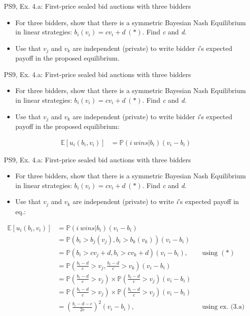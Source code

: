 \begin{frame}{PS9, Ex. 4.a: First-price sealed bid auctions with three bidders}
    \begin{itemize}
      \item[(a)] For three bidders, show that there is a symmetric Bayesian Nash Equilibrium in linear strategies: $b_i(v_i) = cv_i + d\ (*)$. Find \textit{c} and \textit{d}.
      \item[Hint:] Use that $v_j$ and $v_k$ are independent (private) to write bidder \textit{i}'s expected payoff in the proposed equilibrium.
    \end{itemize}
    \vfill\null
\end{frame}
\begin{frame}{PS9, Ex. 4.a: First-price sealed bid auctions with three bidders}
    \begin{itemize}
      \item[(a)] For three bidders, show that there is a symmetric Bayesian Nash Equilibrium in linear strategies: $b_i(v_i) = cv_i + d\ (*)$. Find \textit{c} and \textit{d}.
      \item[Hint:] Use that $v_j$ and $v_k$ are independent (private) to write bidder \textit{i}'s expected payoff in the proposed equilibrium:
    \end{itemize}
    \vspace{-10pt}
    \begin{align*}
      \mathbb{E}[u_i(b_i,v_i)]
      &=\mathbb{P}(i\ wins|b_i)(v_i-b_i)
    \end{align*}
    \vfill\null
\end{frame}
\begin{frame}{PS9, Ex. 4.a: First-price sealed bid auctions with three bidders}
    \begin{itemize}
      \item[(a)] For three bidders, show that there is a symmetric Bayesian Nash Equilibrium in linear strategies: $b_i(v_i) = cv_i + d\ (*)$. Find \textit{c} and \textit{d}.
      \item[Hint:] Use that $v_j$ and $v_k$ are independent (private) to write \textit{i}'s expected payoff in eq.:
    \end{itemize}
    \vspace{-10pt}
    \begin{align*}
      \mathbb{E}[u_i(b_i,v_i)]
      &=\mathbb{P}(i\ wins|b_i)(v_i-b_i)\\
      &=\mathbb{P}\left(b_i>b_j(v_j),b_i>b_k(v_k)\right)(v_i-b_i)\\
      &=\mathbb{P}(b_i>cv_j+d,b_i>cv_k+d)(v_i-b_i),&&\text{using }(*)\\
      &=\mathbb{P}\left(\frac{b_i-d}{c}>v_j,\frac{b_i-d}{c}>v_k\right)(v_i-b_i)\\
      &=\mathbb{P}\left(\frac{b_i-d}{c}>v_j\right)\times\mathbb{P}\left(\frac{b_i-d}{c}>v_j\right)(v_i-b_i)\\
      &=\mathbb{P}\left(\frac{b_i-d}{c}>v_j\right)\times\mathbb{P}\left(\frac{b_i-d}{c}>v_j\right)(v_i-b_i)\\
      &=\left(\frac{b_i-d-c}{2c}\right)^2(v_i-b_i),&&\text{using ex. (3.a)}
    \end{align*}
    \vfill\null
\end{frame}

